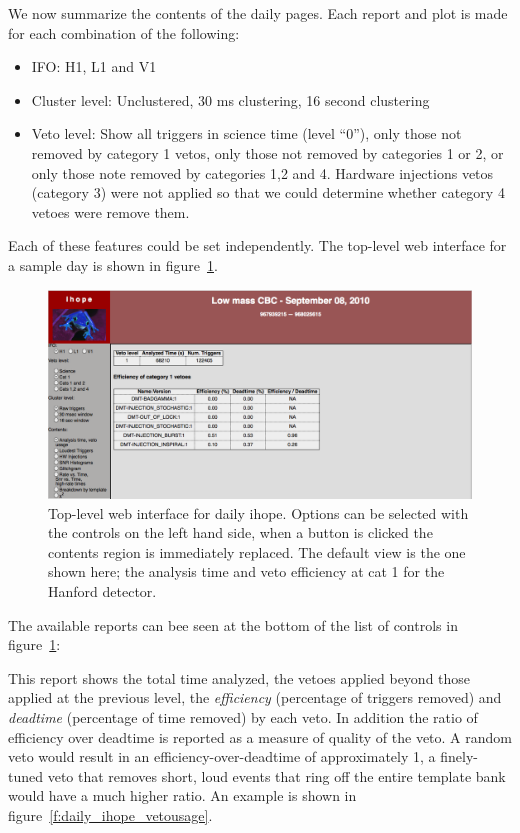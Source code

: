 We now summarize the contents of the daily pages. Each report and plot
is made for each combination of the following:

\begin{itemize}
\item IFO: H1, L1 and V1
\item Cluster level: Unclustered, 30 ms clustering, 16 second
clustering
\item Veto level: Show all triggers in science time (level ``0''),
only those not removed by category 1 vetos, only those not
removed by categories 1 or 2, or only those note removed by
categories 1,2 and 4.  Hardware injections vetos (category 3) were not 
applied so that we could determine whether category 4 vetoes were 
remove them.
\end{itemize}

Each of these features could be set independently.  The top-level web
interface for a sample day is shown in figure~\ref{f:daily_ihope_top}.

\begin{figure}
  \includegraphics[width=\linewidth]{figures/detchar/daily_ihope_top}
  \caption[Top-level web interface for daily ihope]{
  \label{f:daily_ihope_top}
Top-level web interface for daily ihope.  Options can be selected with
the controls on the left hand side, when a button is clicked the
contents region is immediately replaced.  The default view is the one
shown here; the analysis time and veto efficiency at cat 1 for the
Hanford detector.}
\end{figure}%

The available reports can bee seen at the bottom of the list of
controls in figure~\ref{f:daily_ihope_top}:


This report shows the total time analyzed, the vetoes applied beyond
those applied at the previous level, the \emph{efficiency} (percentage
of triggers removed) and \emph{deadtime} (percentage of time removed)
by each veto.  In addition the ratio of efficiency over deadtime is
reported as a measure of quality of the veto.  A random veto would
result in an efficiency-over-deadtime of approximately 1, a
finely-tuned veto that removes short, loud events that ring off the
entire template bank would have a much higher ratio.   An example is
shown in figure~\ref{f:daily_ihope_vetousage}.


